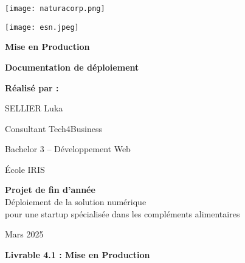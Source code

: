 \documentclass[a4paper,12pt]{report}
\begin{document}
\thispagestyle{empty}
\begin{center}
    \vspace*{0.5cm}
    \begin{minipage}{0.45\textwidth}
        \centering
        \texttt{[image: naturacorp.png]}
        \vspace{0.3cm}
    \end{minipage}
    \hfill
    \begin{minipage}{0.45\textwidth}
        \centering
        \texttt{[image: esn.jpeg]}
        \vspace{0.3cm}
    \end{minipage}
    \vspace{1.5cm}
    
    {\Huge\bfseries\color{naturacorpgreen} Mise en Production\par}
    \vspace{1.5cm}
    
    {\LARGE\bfseries Documentation de déploiement\par}
    \vspace{2cm}
    
    {\Large\bfseries Réalisé par :\par}
    \vspace{0.3cm}
    {\Large SELLIER Luka\par}
    \vspace{0.5cm}
    {\large Consultant Tech4Business\par}
    \vspace{0.3cm}
    {\large Bachelor 3 – Développement Web\par}
    \vspace{0.3cm}
    {\large École IRIS\par}
    \vspace{1.5cm}
    
    \begin{minipage}{0.8\textwidth}
        \centering
        \textbf{Projet de fin d'année}\\
        \vspace{0.2cm}
        Déploiement de la solution numérique\\
        pour une startup spécialisée dans les compléments alimentaires
    \end{minipage}
    \vspace{1.5cm}
    
    {\large Mars 2025\par}
\vspace*{\fill}
\begin{center}
    \textbf{Livrable 4.1 : Mise en Production}
\end{center}
\end{center}
\end{document}
